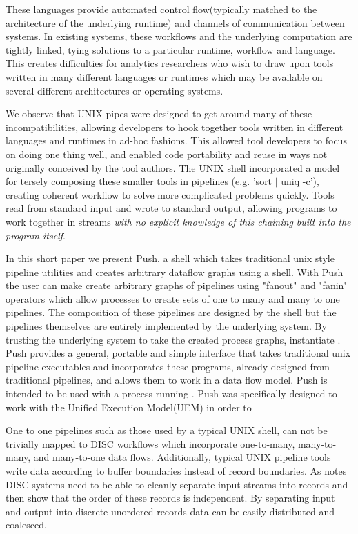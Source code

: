 \documentclass{sig-alt-release2}
\begin{document}
These languages provide automated control flow(typically matched
to the architecture of the underlying runtime) and channels of
communication between systems.  In existing systems, these workflows
and the underlying computation are tightly linked, tying solutions
to a particular runtime, workflow and language.  This creates
difficulties for analytics researchers who wish to draw upon tools
written in many different languages or runtimes which may be available
on several different architectures or operating systems.

We observe that UNIX pipes were designed to get around many of these
incompatibilities, allowing developers to hook together tools written
in different languages and runtimes in ad-hoc fashions.  This allowed
tool developers to focus on doing one thing well, and enabled code
portability and reuse in ways not originally conceived by the tool
authors.  The UNIX shell incorporated a model for tersely composing
these smaller tools in pipelines (e.g. 'sort $|$ uniq -c'), creating
coherent workflow to solve more complicated problems quickly.  Tools
read from standard input and wrote to standard output, allowing
programs to work together in streams \emph{with no explicit knowledge
of this chaining built into the program itself}.

In this short paper we present Push, a shell which takes traditional
unix style pipeline utilities and creates arbitrary dataflow graphs
using a shell. With Push the user can make create arbitrary graphs
of pipelines using "fanout" and "fanin" operators which allow
processes to create sets of one to many and many to one pipelines.
The composition of these pipelines are designed by the shell but
the pipelines themselves are entirely implemented by the underlying
system. By trusting the underlying system to take the created process
graphs, instantiate . Push provides a general, portable and simple
interface that takes traditional unix pipeline executables and
incorporates these programs, already designed from traditional
pipelines, and allows them to work in a data flow model. Push is
intended to be used with a process running . Push was specifically
designed to work with the Unified Execution Model(UEM)\cite{} in
order to


One to one pipelines such as those used by a typical UNIX shell,
can not be trivially mapped to DISC workflows which incorporate
one-to-many, many-to-many, and many-to-one data flows.  Additionally,
typical UNIX pipeline tools write data according to buffer boundaries
instead of record boundaries.  As \cite{pike2005idp} notes DISC
systems need to be able to cleanly separate input streams into
records and then show that the order of these records is independent.
By separating input and output into discrete unordered records data
can be easily distributed and coalesced.
\end{document}
